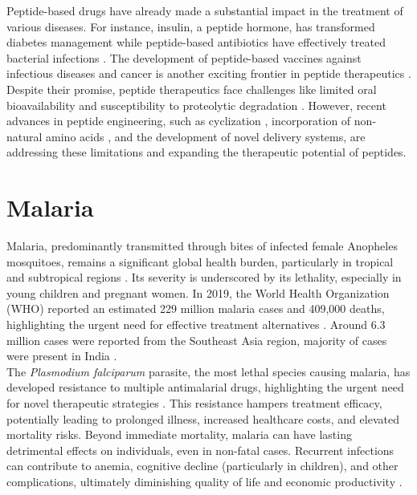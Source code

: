 Peptide-based drugs have already made a substantial impact in the treatment of various diseases. For
instance, insulin, a peptide hormone, has transformed diabetes management while peptide-based
antibiotics have effectively treated bacterial infections \cite{cesar2023adv}. The development of
peptide-based vaccines against infectious diseases and cancer is another exciting frontier in
peptide therapeutics \cite{purcell2007vaccine}. \\

Despite their promise, peptide therapeutics face challenges like limited oral bioavailability and
susceptibility to proteolytic degradation \cite{muttenthaler2021trends}. However, recent advances in
peptide engineering, such as cyclization \cite{hayes2021cycl}, incorporation of non-natural amino
acids \cite{li2022nonnat}, and the development of novel delivery systems, are addressing these
limitations and expanding the therapeutic potential of peptides.

\section{Malaria} 
\label{sec:Malaria} 
Malaria, predominantly transmitted through bites of infected female Anopheles mosquitoes, remains a
significant global health burden, particularly in tropical and subtropical regions
\cite{duguma2022ethiopia, ghosh2021malaria}. Its severity is underscored by its lethality,
especially in young children and pregnant women. In 2019, the World Health Organization (WHO)
reported an estimated 229 million malaria cases and 409,000 deaths, highlighting the urgent need for
effective treatment alternatives \cite{jain2022pregnancy}. Around 6.3 million cases were reported
from the Southeast Asia region, majority of cases were present in India
\cite{cristina2020pregnancy}. \\

The \textit{Plasmodium falciparum} parasite, the most lethal species causing malaria, has developed
resistance to multiple antimalarial drugs, highlighting the urgent need for novel therapeutic
strategies \cite{fairhurst2012artemisinin}. This resistance hampers treatment
efficacy, potentially leading to prolonged illness, increased healthcare costs, and elevated
mortality risks. Beyond immediate mortality, malaria can have lasting detrimental effects on
individuals, even in non-fatal cases. Recurrent infections can contribute to anemia, cognitive
decline (particularly in children), and other complications, ultimately diminishing quality of life
and economic productivity \cite{shukla2022super}.
\\

